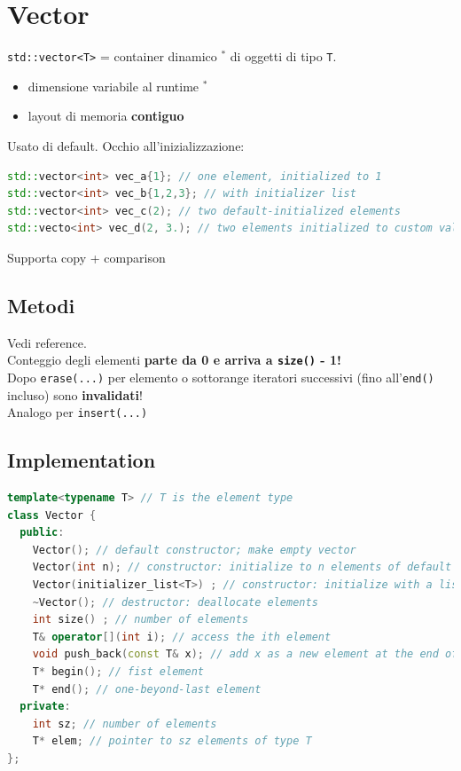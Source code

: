 \documentclass[10pt, oneside]{book}
\begin{document}
\section{Vector}
\texttt{std::vector<T>} = container dinamico $\mathbf{^\ast}$ di oggetti di tipo \texttt{T}.
\begin{itemize}
\item dimensione variabile al runtime $\mathbf{^\ast}$
\item layout di memoria \textbf{contiguo}
\end{itemize}
Usato di default. Occhio all'inizializzazione:
\begin{lstlisting}[language=C++]
std::vector<int> vec_a{1}; // one element, initialized to 1
std::vector<int> vec_b{1,2,3}; // with initializer list
std::vector<int> vec_c(2); // two default-initialized elements
std::vecto<int> vec_d(2, 3.); // two elements initialized to custom value 3.
\end{lstlisting}
Supporta copy + comparison

\subsection{Metodi}
Vedi reference.\\
Conteggio degli elementi \textbf{parte da 0 e arriva a \texttt{size()} - 1!}\\
Dopo \texttt{erase(...)} per elemento o sottorange iteratori successivi (fino all'\texttt{end()} incluso) sono \textbf{invalidati}!\\
Analogo per \texttt{insert(...)}

\subsection{Implementation}
\begin{lstlisting}[language=C++]
template<typename T> // T is the element type
class Vector {
  public:
	Vector(); // default constructor; make empty vector
	Vector(int n); // constructor: initialize to n elements of default type
	Vector(initializer_list<T>) ; // constructor: initialize with a list of elements
	~Vector(); // destructor: deallocate elements
	int size() ; // number of elements
	T& operator[](int i); // access the ith element
	void push_back(const T& x); // add x as a new element at the end of the vector
	T* begin(); // fist element
	T* end(); // one-beyond-last element
  private:
	int sz; // number of elements
	T* elem; // pointer to sz elements of type T
};
\end{lstlisting}
\end{document}
